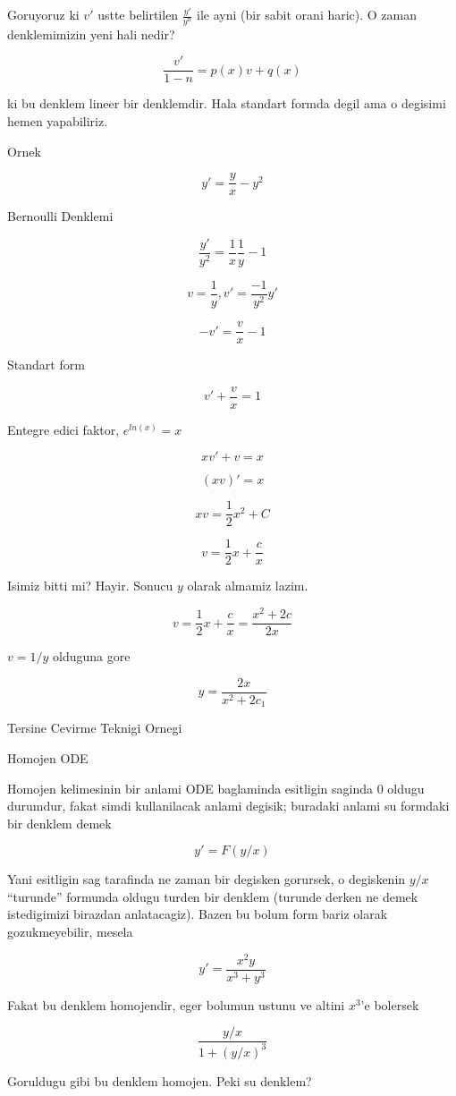 \documentclass[12pt,fleqn]{article}\usepackage{../common}
\begin{document}
Goruyoruz ki $v'$ ustte belirtilen $\frac{y'}{y^n}$ ile ayni (bir sabit
orani haric). O zaman denklemimizin yeni hali nedir?

\[ \frac{v'}{1-n} = p(x)v + q(x) \]

ki bu denklem lineer bir denklemdir. Hala standart formda degil ama o
degisimi hemen yapabiliriz. 

Ornek

\[ y' = \frac{y}{x} - y^2 \]

Bernoulli Denklemi 

\[ \frac{y'}{y^2} = \frac{1}{x}\frac{1}{y} - 1 \]

\[ v = \frac{1}{y}, v' = \frac{-1}{y^2}y' \]

\[ -v' = \frac{v}{x} - 1 \]

Standart form

\[ v' + \frac{v}{x} = 1 \]

Entegre edici faktor, $e^{ln(x)} = x$

\[ xv' + v = x \]

\[ (xv)' = x \]

\[ xv = \frac{1}{2}x^2 + C \]

\[ v = \frac{1}{2}x + \frac{c}{x} \]

Isimiz bitti mi? Hayir. Sonucu $y$ olarak almamiz lazim. 

\[ v = \frac{1}{2}x + \frac{c}{x} = \frac{x^2+2c}{2x}\]

$v = 1/y$ olduguna gore

\[ y = \frac{2x}{x^2+2c_1}\]

Tersine Cevirme Teknigi Ornegi

Homojen ODE

Homojen kelimesinin bir anlami ODE baglaminda esitligin saginda 0
oldugu durumdur, fakat simdi kullanilacak anlami degisik; buradaki
anlami su formdaki bir denklem demek

\[ y' = F(y/x) \]

Yani esitligin sag tarafinda ne zaman bir degisken gorursek, o
degiskenin $y/x$ ``turunde'' formunda oldugu turden bir denklem
(turunde derken ne demek istedigimizi birazdan anlatacagiz). Bazen bu
bolum form bariz olarak gozukmeyebilir, mesela

\[ y' = \frac{x^2y}{x^3 + y^3} \]

Fakat bu denklem homojendir, eger bolumun ustunu ve altini $x^3$'e
bolersek

\[ \frac{y/x}{1+(y/x)^3} \]

Goruldugu gibi bu denklem homojen. Peki su denklem?
\end{document}
